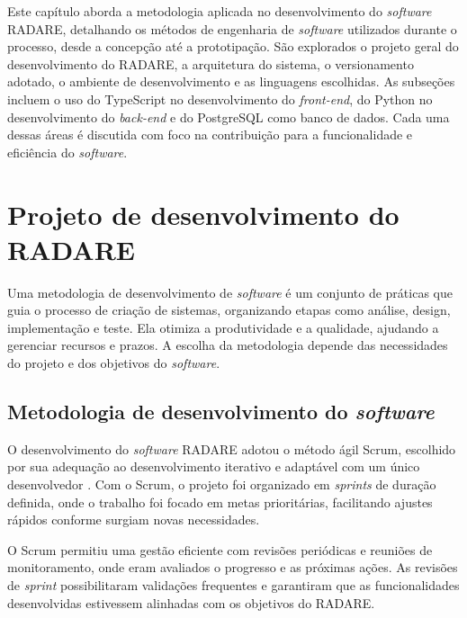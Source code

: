 \label{Cap:Metodologia}

Este capítulo aborda a metodologia aplicada no desenvolvimento do \textit{software} RADARE, detalhando os métodos de engenharia de \textit{software} utilizados durante o processo, desde a concepção até a prototipação. São explorados o projeto geral do desenvolvimento do RADARE, a arquitetura do sistema, o versionamento adotado, o ambiente de desenvolvimento e as linguagens escolhidas. As subseções incluem o uso do TypeScript no desenvolvimento do \textit{front-end}, do Python no desenvolvimento do \textit{back-end} e do PostgreSQL como banco de dados. Cada uma dessas áreas é discutida com foco na contribuição para a funcionalidade e eficiência do \textit{software}.

\section{Projeto de desenvolvimento do RADARE}

Uma metodologia de desenvolvimento de \textit{software} é um conjunto de práticas que guia o processo de criação de sistemas, organizando etapas como análise, design, implementação e teste. Ela otimiza a produtividade e a qualidade, ajudando a gerenciar recursos e prazos. A escolha da metodologia depende das necessidades do projeto e dos objetivos do \textit{software}.

\subsection{Metodologia de desenvolvimento do \textit{software}}

O desenvolvimento do \textit{software} RADARE adotou o método ágil Scrum, escolhido por sua adequação ao desenvolvimento iterativo e adaptável com um único desenvolvedor \cite{softwareengreq}. Com o Scrum, o projeto foi organizado em \textit{sprints} de duração definida, onde o trabalho foi focado em metas prioritárias, facilitando ajustes rápidos conforme surgiam novas necessidades.

O Scrum permitiu uma gestão eficiente com revisões periódicas e reuniões de monitoramento, onde eram avaliados o progresso e as próximas ações. As revisões de \textit{sprint} possibilitaram validações frequentes e garantiram que as funcionalidades desenvolvidas estivessem alinhadas com os objetivos do RADARE. 

